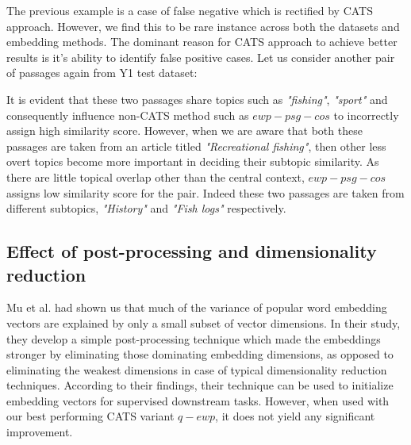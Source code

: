 \documentclass[sigconf,authordraft]{acmart}
\begin{document}
The previous example is a case of false negative which is rectified by CATS approach. However, we find this to be rare instance across both the datasets and embedding methods. The dominant reason for CATS approach to achieve better results is it's ability to identify false positive cases. Let us consider another pair of passages again from Y1 test dataset:

\noindent{}

It is evident that these two passages share topics such as \textit{"fishing"}, \textit{"sport"} and consequently influence non-CATS method such as $ewp-psg-cos$ to incorrectly assign high similarity score. However, when we are aware that both these passages are taken from an article titled \textit{"Recreational fishing"}, then other less overt topics become more important in deciding their subtopic similarity. As there are little topical overlap other than the central context, $ewp-psg-cos$ assigns low similarity score for the pair. Indeed these two passages are taken from different subtopics, \textit{"History"} and \textit{"Fish logs"} respectively. 

\subsection{Effect of post-processing and dimensionality reduction} Mu et al. had shown us that much of the variance of popular word embedding vectors are explained by only a small subset of vector dimensions. In their study, they develop a simple post-processing technique which made the embeddings stronger by eliminating those dominating embedding dimensions, as opposed to eliminating the weakest dimensions in case of typical dimensionality reduction techniques. According to their findings, their technique can be used to initialize embedding vectors for supervised downstream tasks. However, when used with our best performing CATS variant $q-ewp$, it does not yield any significant improvement.
\end{document}
